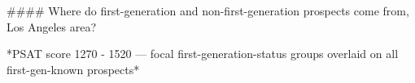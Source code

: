 #### Where do first-generation and non-first-generation prospects come from, Los Angeles area?

*PSAT score 1270 - 1520 — focal first-generation-status groups overlaid on all first-gen-known prospects*
